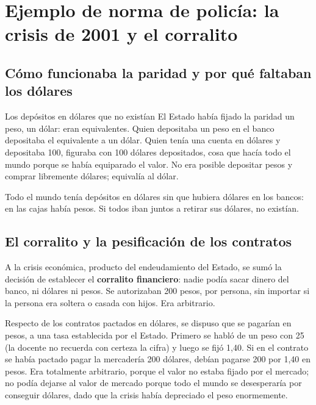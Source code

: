 \documentclass[12pt,oneside]{book}
\begin{document}
\section{Ejemplo de norma de polic\'ia: la crisis de 2001 y el corralito}

\subsection{C\'omo funcionaba la paridad y por qu\'e faltaban los d\'olares}

\begin{example}{Los dep\'ositos en d\'olares que no exist\'ian}
El Estado hab\'ia fijado la paridad un peso, un d\'olar: eran equivalentes. Quien depositaba un peso en el banco depositaba el equivalente a un d\'olar. Quien ten\'ia una cuenta en d\'olares y depositaba 100, figuraba con 100 d\'olares depositados, cosa que hac\'ia todo el mundo porque se hab\'ia equiparado el valor. No era posible depositar pesos y comprar libremente d\'olares; equival\'ia al d\'olar.

Todo el mundo ten\'ia dep\'ositos en d\'olares sin que hubiera d\'olares en los bancos: en las cajas hab\'ia pesos. Si todos iban juntos a retirar sus d\'olares, no exist\'ian.
\end{example}

\subsection{El corralito y la pesificaci\'on de los contratos}

A la crisis econ\'omica, producto del endeudamiento del Estado, se sum\'o la decisi\'on de establecer el \textbf{corralito financiero}: nadie pod\'ia sacar dinero del banco, ni d\'olares ni pesos. Se autorizaban 200 pesos, por persona, sin importar si la persona era soltera o casada con hijos. Era arbitrario.

Respecto de los contratos pactados en d\'olares, se dispuso que se pagar\'ian en pesos, a una tasa establecida por el Estado. Primero se habl\'o de un peso con 25 (la docente no recuerda con certeza la cifra) y luego se fij\'o 1,40. Si en el contrato se hab\'ia pactado pagar la mercader\'ia 200 d\'olares, deb\'ian pagarse 200 por 1,40 en pesos. Era totalmente arbitrario, porque el valor no estaba fijado por el mercado; no pod\'ia dejarse al valor de mercado porque todo el mundo se desesperar\'ia por conseguir d\'olares, dado que la crisis hab\'ia depreciado el peso enormemente.
\end{document}
